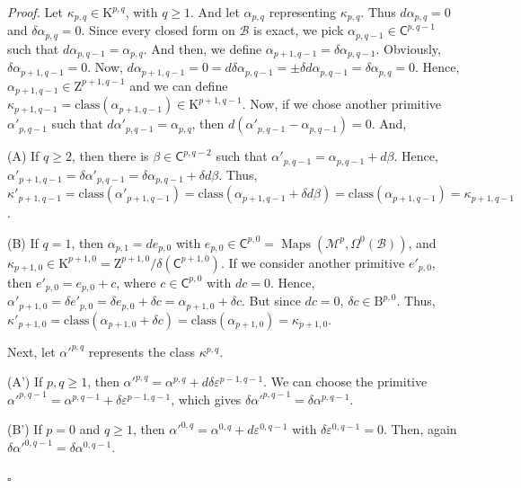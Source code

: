 \documentclass[12pt,reqno]{amsart}
\theoremstyle{article}
\renewenvironment{proof}{\noindent \textit{Proof.}} {\nolinebreak\hfill $\square$}
\def \B{\mathrm B}
\def \K{\mathrm K}
\def \Z{\mathrm Z}
\newcommand{\cB}{{\mathcal B}}
\newcommand{\cM}{\mathcal{M}}
\newcommand{\sC}{\mathsf{C}}
\newcommand{\class}{\mathrm{class}}
\DeclareMathOperator{\Maps}{Maps}
\let \epsilon=\varepsilon
\begin{document}
  \begin{proof}
    Let $\kappa_{p,q} \in \K^{p,q}$,
    with $q\geq 1$.
    And let $\alpha_{p,q}$ representing $\kappa_{p,q}$.
    Thus $d\alpha_{p,q}=0$ and $\delta \alpha_{p,q}=0$.
    Since every closed form on $\cB$ is exact,
    we pick $\alpha_{p,q-1} \in \sC^{p,q-1}$ such that $d\alpha_{p,q-1} = \alpha_{p,q}$.
    And then,
    we define $\alpha_{p+1,q-1} = \delta\alpha_{p,q-1}$.
    Obviously,
    $\delta\alpha_{p+1,q-1}=0$.
    Now,
    $d\alpha_{p+1,q-1}=0 = d\delta\alpha_{p,q-1}= \pm \delta d \alpha_{p,q-1} = \delta \alpha_{p,q} = 0$.
    Hence,
    $\alpha_{p+1,q-1} \in \Z^{p+1,q-1}$ and we can define $\kappa_{p+1,q-1} = \class(\alpha_{p+1,q-1}) \in \K^{p+1,q-1}$.
    Now,
    if we chose another primitive $\alpha'_{p,q-1}$ such that $d\alpha'_{p,q-1} = \alpha_{p,q}$,
    then $d(\alpha'_{p,q-1} - \alpha_{p,q-1}) = 0$.
    And,
    
    (A) If $q \geq 2$,
    then there is $\beta \in \sC^{p,q-2}$ such that $\alpha'_{p,q-1} = \alpha_{p,q-1} + d\beta$.
    Hence,
    $\alpha'_{p+1,q-1} = \delta\alpha'_{p,q-1} = \delta \alpha_{p,q-1} + \delta d\beta$.
    Thus,
    $\kappa'_{p+1,q-1} = \class(\alpha'_{p+1,q-1}) = \class(\alpha_{p+1,q-1} + \delta d \beta) = \class(\alpha_{p+1,q-1}) = \kappa_{p+1,q-1}$.
    
    (B) If $q = 1$,
    then $\alpha_{p,1} = de_{p,0}$ with $e_{p,0} \in \sC^{p,0} = \Maps(\cM^p,\Omega^0(\cB))$,
    and $\kappa_{p+1,0} \in \K^{p+1,0} = \Z^{p+1,0}/\delta(\sC^{p+1,0})$.
    If we consider another primitive $e'_{p,0}$,
    then $e'_{p,0} = e_{p,0} + c$,
    where $c \in \sC^{p,0}$ with $dc=0$.
    Hence,
    $\alpha'_{p+1,0} = \delta e'_{p,0} = \delta e_{p,0} + \delta c = \alpha_{p+1,0} + \delta c$.
    But since $dc=0$,
    $\delta c \in \B^{p,0}$.
    Thus,
    $\kappa'_{p+1,0} = \class(\alpha_{p+1,0} + \delta c) = \class(\alpha_{p+1,0}) = \kappa_{p+1,0}$.
    
    Next,
    let $\alpha'^{p,q}$ represents the class $\kappa^{p,q}$.
    
    (A') If $p,q \geq 1$,
    then $\alpha'^{p,q} = \alpha^{p,q} + d\delta \epsilon^{p-1,q-1}$.
    We can choose the primitive $\alpha'^{p,q-1} = \alpha^{p,q-1} + \delta \epsilon^{p-1,q-1}$,
    which gives $\delta\alpha'^{p,q-1} = \delta\alpha^{p,q-1}$.
    
    (B') If $p = 0$ and $q\geq 1$,
    then $\alpha'^{0,q} = \alpha^{0,q} + d\epsilon^{0,q-1}$ with $\delta\epsilon^{0,q-1}= 0$.
    Then,
    again $\delta\alpha'^{0,q-1} = \delta\alpha^{0,q-1}$.
    

\end{proof}
\end{document}
